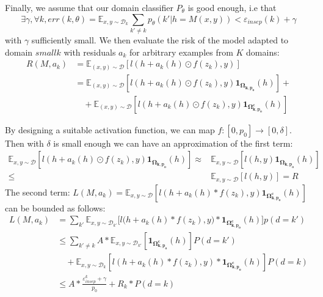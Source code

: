 \documentclass[12pt,times,a4paper,twoside]{article}
\newcommand{\fyTodo}[1]{\Todo[FY:]{\textcolor{orange}{#1}}}
\newcommand{\fyDone}[1]{\done[FY]\Todo[FY:]{\textcolor{orange}{#1}}}
\theoremstyle{definition}
\begin{document}
Finally, we assume that our domain classifier $P_\theta$ is good enough, i.e that\fyDone{Attention à $p$}
$$\exists \gamma, \forall k, err(k, \theta) = \mathbb{E}_{x,y \sim \mathcal{D}_{k}} \sum_{k' \neq k} p_\theta(k'|h=M(x,y)) < \varepsilon_{insep}(k) + \gamma$$ with $\gamma$ sufficiently small.
We then evaluate the risk of the model adapted to domain $smallk$ with residuals $a_k$ for arbitrary examples from $K$ domains:\fyTodo{(x,y) is sampled from some distribution}
\begin{equation}
\begin{split}
  R(M,a_k) &= \mathbb{E}_{(x,y) \sim \mathcal{D}}[l(h + a_k(h) \odot f(z_k),y)] \\
  &= \mathbb{E}_{(x,y) \sim \mathcal{D}}[l(h + a_k(h) \odot f(z_k),y)\mathbf{1}_{\mathbf{\Omega_{k,p_{0}}}}(h)] + \\
  &\quad + \mathbb{E}_{(x,y) \sim \mathcal{D}}[l(h + a_k(h) \odot f(z_k),y) \mathbf{1}_{\mathbf{\Omega_{k,p_{0}}^{c}}}(h)]
\end{split}
\end{equation}

By designing a suitable activation function, we can map $f: [0,p_{0}] \rightarrow [0,\delta]$. Then with $\delta$ is small enough we can have an approximation of the first term:\fyTodo{We need $l$ to be smooth here, no ?}
\begin{align*}
  \mathbb{E}_{x,y \sim \mathcal{D}}[l(h + a_k(h) \odot f(z_k),y)\mathbf{1}_{\mathbf{\Omega_{k,p_{0}}}}(h)] \approx{}&
                                                                                                                      \mathbb{E}_{x,y \sim \mathcal{D}}[l(h,y)\mathbf{1}_\mathbf{\Omega_{k,p_{0}}}(h)] \\
  \leq& \mathbb{E}_{x,y \sim \mathcal{D}}[l(h,y)] = R
\label{eq:4}
\end{align*}
The second term: $ L(M,a_k) = \mathbb{E}_{x,y \sim \mathcal{D}}[l(h + a_k(h) * f(z_k),y) \mathbf{1}_{\mathbf{\Omega_{k,p_{0}}^{c}}}(h)]$ can be bounded as follows:
\begin{equation*}
\begin{split}
L(M,a_k) &= \displaystyle{\mathop{\sum}_{k'}\mathbb{E}_{x,y \sim \mathcal{D}_{k'}}[l(h } + a_k(h) * f(z_k),y) * \mathbf{1}_{\mathbf{\Omega_{k,p_{0}}^{c}}}(h)]p(d=k') \\
	& \leq \displaystyle{\mathop{\sum}_{k' \neq k}} A * \mathbb{E}_{x,y \sim \mathcal{D}_{k'}} [\mathbf{1}_{\mathbf{\Omega_{k,p_{0}}^{c}}}(h)]P(d=k') \\
	& \quad + \mathbb{E}_{x,y \sim \mathcal{D}_k}[l(h + a_k(h) * f(z_k),y) * \mathbf{1}_{\mathbf{\Omega_{k,p_{0}}^{c}}}(h)]P(d=k) \\
	&\leq A * \frac{\mathbb{\varepsilon}_{insep}^k + \gamma}{p_{0}} + R_k * P(d=k)
\end{split}
\label{eq:5}
\end{equation*}
\end{document}

